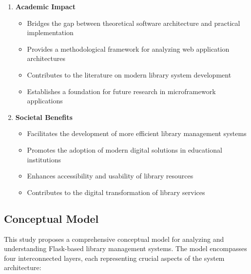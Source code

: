 \documentclass{article}
\begin{document}
\begin{enumerate}
    \item \textbf{Academic Impact}
    \begin{itemize}
        \item Bridges the gap between theoretical software architecture and 
              practical implementation
        \item Provides a methodological framework for analyzing web application 
              architectures
        \item Contributes to the literature on modern library system development
        \item Establishes a foundation for future research in microframework 
              applications
    \end{itemize}
    
    \item \textbf{Societal Benefits}
    \begin{itemize}
        \item Facilitates the development of more efficient library management 
              systems
        \item Promotes the adoption of modern digital solutions in educational 
              institutions
        \item Enhances accessibility and usability of library resources
        \item Contributes to the digital transformation of library services
    \end{itemize}
\end{enumerate}

\subsection{Conceptual Model}

This study proposes a comprehensive conceptual model for analyzing and understanding Flask-based library management systems. The model encompasses four interconnected layers, each representing crucial aspects of the system architecture:
\end{document}
